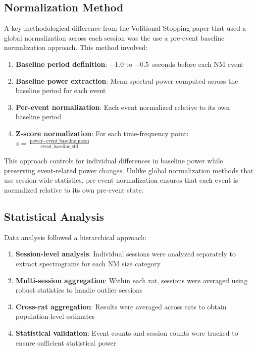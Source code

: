 \documentclass[11pt]{article}
\begin{document}
\subsection{Normalization Method}

A key methodological difference from the Volitional Stopping paper that used a global normalization across each session was the use a pre-event baseline normalization approach. This method involved:

\begin{enumerate}
\item \textbf{Baseline period definition}: $-1.0$ to $-0.5$~seconds before each NM event
\item \textbf{Baseline power extraction}: Mean spectral power computed across the baseline period for each event
\item \textbf{Per-event normalization}: Each event normalized relative to its own baseline period
\item \textbf{Z-score normalization}: For each time-frequency point: $z = \frac{\text{power} - \text{event\_baseline\_mean}}{\text{event\_baseline\_std}}$
\end{enumerate}

This approach controls for individual differences in baseline power while preserving event-related power changes. Unlike global normalization methods that use session-wide statistics, pre-event normalization ensures that each event is normalized relative to its own pre-event state.

\subsection{Statistical Analysis}

Data analysis followed a hierarchical approach:

\begin{enumerate}
\item \textbf{Session-level analysis}: Individual sessions were analyzed separately to extract spectrograms for each NM size category
\item \textbf{Multi-session aggregation}: Within each rat, sessions were averaged using robust statistics to handle outlier sessions
\item \textbf{Cross-rat aggregation}: Results were averaged across rats to obtain population-level estimates
\item \textbf{Statistical validation}: Event counts and session counts were tracked to ensure sufficient statistical power
\end{enumerate}
\end{document}
